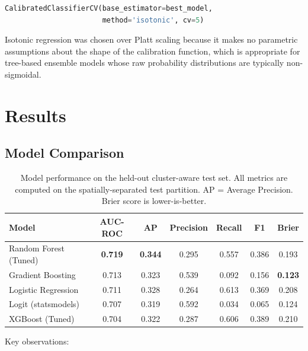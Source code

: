 \documentclass[12pt, a4paper]{article}
\begin{document}
\begin{lstlisting}[language=Python]
CalibratedClassifierCV(base_estimator=best_model,
                       method='isotonic', cv=5)
\end{lstlisting}

Isotonic regression was chosen over Platt scaling because it makes no parametric assumptions about the shape of the calibration function, which is appropriate for tree-based ensemble models whose raw probability distributions are typically non-sigmoidal.


\section{Results}

\subsection{Model Comparison}

\begin{table}[H]
\centering
\caption{Model performance on the held-out cluster-aware test set. All metrics are computed on the spatially-separated test partition. AP = Average Precision. Brier score is lower-is-better.}
\label{tab:results}
\begin{tabular}{lcccccc}
\toprule
\textbf{Model} & \textbf{AUC-ROC} & \textbf{AP} & \textbf{Precision} & \textbf{Recall} & \textbf{F1} & \textbf{Brier} \\
\midrule
Random Forest (Tuned)   & \textbf{0.719} & \textbf{0.344} & 0.295 & 0.557 & 0.386 & 0.193 \\
Gradient Boosting       & 0.713          & 0.323          & 0.539 & 0.092 & 0.156 & \textbf{0.123} \\
Logistic Regression     & 0.711          & 0.328          & 0.264 & 0.613 & 0.369 & 0.208 \\
Logit (statsmodels)     & 0.707          & 0.319          & 0.592 & 0.034 & 0.065 & 0.124 \\
XGBoost (Tuned)         & 0.704          & 0.322          & 0.287 & 0.606 & 0.389 & 0.210 \\
\bottomrule
\end{tabular}
\end{table}

Key observations:
\end{document}
